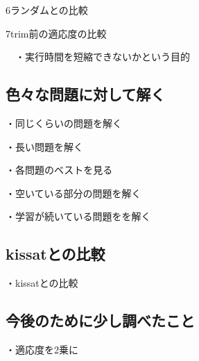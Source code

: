 6ランダムとの比較

7trim前の適応度の比較

　・実行時間を短縮できないかという目的



\subsection{色々な問題に対して解く}%

・同じくらいの問題を解く

・長い問題を解く

・各問題のベストを見る

・空いている部分の問題を解く

・学習が続いている問題をを解く



\subsection{kissatとの比較}%

・kissatとの比較



\subsection{今後のために少し調べたこと}

・適応度を2乗に